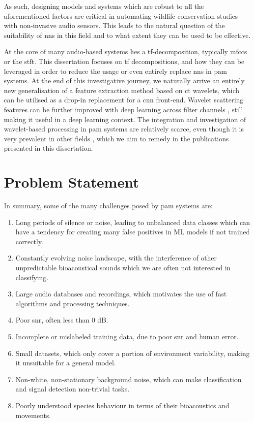 As such, designing models and systems which are robust to all the aforementioned factors are critical in automating wildlife conservation studies with non-invasive audio sensors. This leads to the natural question of the suitability of \acp{nn} in this field and to what extent they can be used to be effective.

At the core of many audio-based systems lies a \ac{tf}-decomposition, typically \acp{mfcc} or the \ac{stft}. This dissertation focuses on \ac{tf} decompositions, and how they can be leveraged in order to reduce the usage or even entirely replace \acp{nn} in \ac{pam} systems. At the end of this investigative journey, we naturally arrive an entirely new generalisation of a feature extraction method based on \ac{ct} wavelets, which can be utilised as a drop-in replacement for a \ac{cnn} front-end. Wavelet scattering features can be further improved with deep learning across filter channels \cite{nnphasecollapse}, still making it useful in a deep learning context. The integration and investigation of wavelet-based processing in \ac{pam} systems are relatively scarce, even though it is very prevalent in other fields \citep{denoising,ws_fault_diag, waveletfault, waveletflight, waveletflow, waveletimagedenoising}, which we aim to remedy in the publications presented in this dissertation.

\section{Problem Statement}
\label{sec:problem}

In summary, some of the many challenges posed by \ac{pam} systems are:
\begin{enumerate}
    \item Long periods of silence or noise, leading to unbalanced data classes which can have a tendency for creating many false positives in ML models if not trained correctly.
    \item Constantly evolving noise landscape, with the interference of other unpredictable bioacoustical sounds which we are often not interested in classifying.
    \item Large audio databases and recordings, which motivates the use of fast algorithms and processing techniques.
    \item Poor \ac{snr}, often less than 0 dB.
    \item Incomplete or mislabeled training data, due to poor \ac{snr} and human error.
    \item Small datasets, which only cover a portion of environment variability, making it unsuitable for a general model.
    \item Non-white, non-stationary background noise, which can make classification and signal detection non-trivial tasks.
    \item Poorly understood species behaviour in terms of their bioacoustics and movements.
\end{enumerate}


